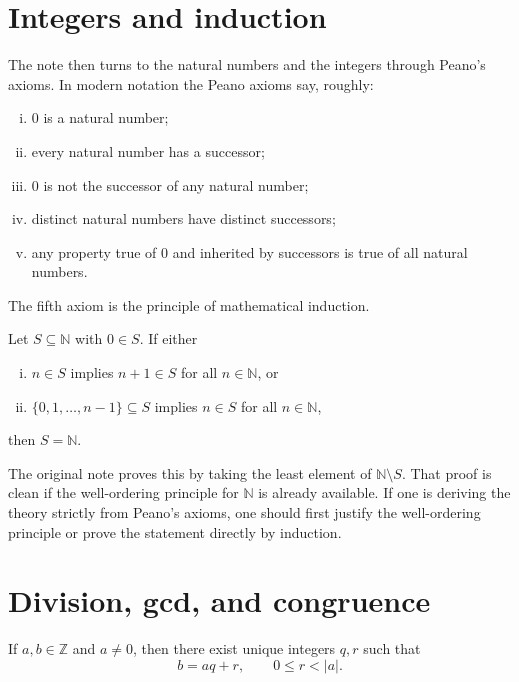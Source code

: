 \section{Integers and induction}

The note then turns to the natural numbers and the integers through Peano's axioms.  In modern notation the Peano axioms say, roughly:
\begin{enumerate}[(i)]
  \item \(0\) is a natural number;
  \item every natural number has a successor;
  \item \(0\) is not the successor of any natural number;
  \item distinct natural numbers have distinct successors;
  \item any property true of \(0\) and inherited by successors is true of all natural numbers.
\end{enumerate}
The fifth axiom is the principle of mathematical induction.

\begin{theorem}
Let \(S\subseteq \mathbb N\) with \(0\in S\).  If either
\begin{enumerate}[(i)]
  \item \(n\in S\) implies \(n+1\in S\) for all \(n\in\mathbb N\), or
  \item \(\{0,1,\dots,n-1\}\subseteq S\) implies \(n\in S\) for all \(n\in\mathbb N\),
\end{enumerate}
then \(S=\mathbb N\).
\end{theorem}

\begin{caution}
The original note proves this by taking the least element of \(\mathbb N\setminus S\).  That proof is clean if the well-ordering principle for \(\mathbb N\) is already available.  If one is deriving the theory strictly from Peano's axioms, one should first justify the well-ordering principle or prove the statement directly by induction.
\end{caution}

\section{Division, gcd, and congruence}

\begin{theorem}
If \(a,b\in\mathbb Z\) and \(a\neq0\), then there exist unique integers \(q,r\) such that
\[
  b=aq+r,
  \qquad
  0\le r<|a|.
\]
\end{theorem}

